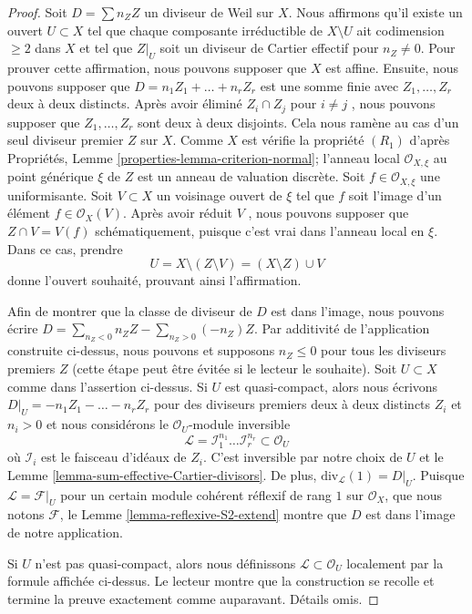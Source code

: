 \begin{proof}
\medskip\noindent
Soit  $D = \sum n_Z Z$  un diviseur de Weil sur  $X$. Nous affirmons qu'il
existe un ouvert  $U \subset X$  tel que chaque composante irréductible de
 $X \setminus U$  ait codimension  $\geq 2$  dans  $X$  et tel que
 $Z|_U$  soit un diviseur de Cartier effectif pour  $n_Z \not = 0$. Pour prouver
cette affirmation, nous pouvons supposer que  $X$  est affine. Ensuite,
nous pouvons supposer que  $D = n_1 Z_1 + \ldots + n_r Z_r$  est une somme finie avec  $Z_1, \ldots, Z_r$  deux
à deux distincts. Après avoir éliminé  $Z_i \cap Z_j$  pour  $i \not = j$ , nous pouvons
supposer que  $Z_1, \ldots, Z_r$  sont deux à deux disjoints. Cela nous ramène au cas d'un
seul diviseur premier  $Z$  sur  $X$. Comme  $X$  est
 vérifie la propriété  $(R_1)$  d'après Propriétés, Lemme  \ref{properties-lemma-criterion-normal}; l'anneau local
 $\mathcal{O}_{X, \xi}$  au point générique  $\xi$  de  $Z$  est un anneau de
valuation discrète. Soit  $f \in \mathcal{O}_{X, \xi}$  une uniformisante. Soit  $V \subset X$  un
voisinage ouvert de  $\xi$  tel que  $f$  soit l'image d'un élément
 $f \in \mathcal{O}_X(V)$. Après avoir réduit  $V$ , nous pouvons supposer que
 $Z \cap V = V(f)$  schématiquement, puisque c'est vrai dans l'anneau local en
 $\xi$. Dans ce cas, prendre
$$
U = X \setminus (Z \setminus V) = (X \setminus Z) \cup V
$$
donne l'ouvert souhaité, prouvant ainsi l'affirmation.

\medskip\noindent
Afin de montrer que la classe de diviseur de  $D$  est dans l'image, nous
pouvons écrire  $D = \sum_{n_Z < 0} n_Z Z - \sum_{n_Z > 0} (-n_Z) Z$. Par additivité de l'application construite ci-dessus,
nous pouvons et supposons  $n_Z \leq 0$  pour tous les diviseurs premiers
 $Z$  (cette étape peut être évitée si le lecteur le souhaite). Soit
 $U \subset X$  comme dans l'assertion ci-dessus. Si  $U$  est quasi-compact,
alors nous écrivons  $D|_U = -n_1 Z_1 - \ldots - n_r Z_r$  pour des diviseurs premiers deux à deux distincts
 $Z_i$  et  $n_i > 0$  et nous considérons le  $\mathcal{O}_U$-module inversible
$$
\mathcal{L} =
\mathcal{I}_1^{n_1} \ldots \mathcal{I}_r^{n_r} \subset \mathcal{O}_U
$$
où  $\mathcal{I}_i$  est le faisceau d'idéaux de  $Z_i$. C'est inversible par
notre choix de  $U$  et le Lemme  \ref{lemma-sum-effective-Cartier-divisors}. De plus,  $\text{div}_\mathcal{L}(1) = D|_U$.
Puisque  $\mathcal{L} = \mathcal{F}|_U$  pour un certain module cohérent réflexif de rang  $1$  sur
 $\mathcal{O}_X$, que nous notons  $\mathcal{F}$, le Lemme  \ref{lemma-reflexive-S2-extend}  montre que
 $D$  est dans l'image de notre application.

\medskip\noindent
Si  $U$  n'est pas quasi-compact, alors nous définissons  $\mathcal{L} \subset \mathcal{O}_U$ 
localement par la formule affichée ci-dessus. Le lecteur montre que la
construction se recolle et termine la preuve exactement comme auparavant. Détails
omis.
\end{proof}

